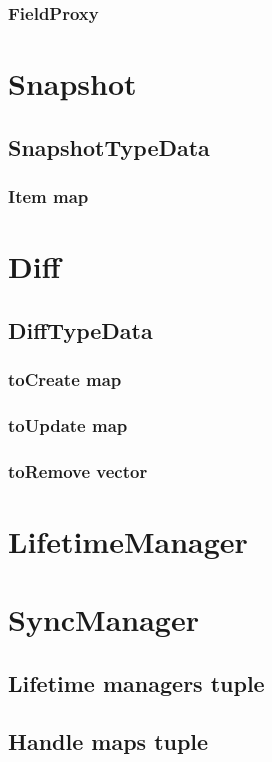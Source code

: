 \documentclass{report}
\begin{document}
				\subsubsection{FieldProxy}
		
		\section{Snapshot}
			\subsection{SnapshotTypeData}
				\subsubsection{Item map}
			
		\section{Diff}
			\subsection{DiffTypeData}
				\subsubsection{toCreate map}

				\subsubsection{toUpdate map}

				\subsubsection{toRemove vector}
		
		\section{LifetimeManager}

		\section{SyncManager}
			\subsection{Lifetime managers tuple}

			\subsection{Handle maps tuple}
\end{document}
